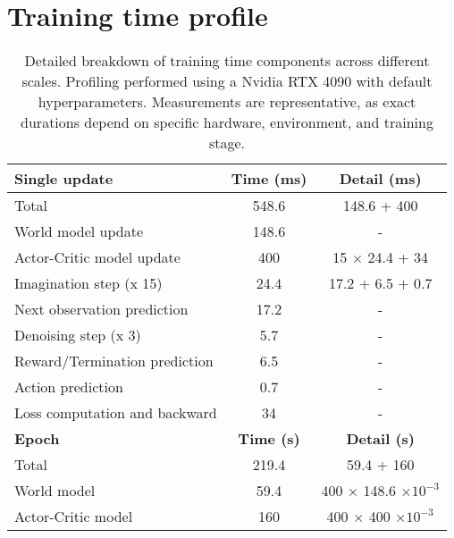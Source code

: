 \section{Training time profile}
\label{appendix:training_time_profile}
\begin{table}[hbt!]
\centering
\caption{Detailed breakdown of training time components across different scales. Profiling performed using a Nvidia RTX 4090 with default hyperparameters. Measurements are representative, as exact durations depend on specific hardware, environment, and training stage.}
\vspace{1em}
\label{tab:time_profile}
\begin{tabular}{@{}lcc@{}}
\toprule
\textbf{Single update}                         & \textbf{Time (ms)} & \textbf{Detail (ms)}       \\ \midrule
Total                                         & 548.6              & 148.6 + 400                \\
\quad World model update                      & 148.6              & -                          \\
\quad Actor-Critic model update               & 400                & 15 $\times$ 24.4 + 34      \\
\qquad Imagination step (x 15)                & 24.4               & 17.2 + 6.5 + 0.7           \\
\qquad \quad Next observation prediction      & 17.2               & -                          \\
\qquad \quad Denoising step (x 3)             & 5.7                & -                          \\
\qquad \quad Reward/Termination prediction    & 6.5                & -                          \\
\qquad \quad Action prediction                & 0.7                & -                          \\
\qquad Loss computation and backward          & 34                 & -                          \\ \midrule
\textbf{Epoch}                                & \textbf{Time (s)}  & \textbf{Detail (s)}        \\ \midrule
Total                                         & 219.4              & 59.4 + 160              \\
\quad World model                             & 59.4               & 400 $\times$ 148.6 $\times 10^{-3}$ \\
\quad Actor-Critic model                      & 160                & 400 $\times$ 400 $\times 10^{-3}$ \\ \midrule

\end{tabular}
\end{table}
